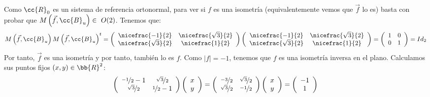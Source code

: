 \begin{ejercicio}
\begin{enumerate}
        Como $\cc{R}_0$ es un sistema de referencia ortonormal, para ver si $f$ es una isometría (equivalentemente vemos que $\vec{f}$ lo es) basta con probar que $M\left(\vec{f}, \cc{B}_u\right)\in~O(2)$. Tenemos que:
        \begin{equation*}
            M\left(\vec{f},\cc{B}_u\right)M\left(\vec{f},\cc{B}_u\right)^t
            = 
            \left(
            \begin{array}{cc}
                \nicefrac{-1}{2} & \nicefrac{\sqrt{3}}{2} \\
                \nicefrac{\sqrt{3}}{2} & \nicefrac{1}{2}
            \end{array}
            \right)
            \left(
            \begin{array}{cc}
                \nicefrac{-1}{2} & \nicefrac{\sqrt{3}}{2} \\
                \nicefrac{\sqrt{3}}{2} & \nicefrac{1}{2}
            \end{array}
            \right)
            = 
            \left(
            \begin{array}{cc}
                1 & 0 \\
                0 & 1 \\
            \end{array}
            \right) = Id_2
        \end{equation*}
        Por tanto, $\vec{f}$ es una isometría y por tanto, también lo es $f$. Como $|f|=-1$, tenemos que $f$ es una isometría inversa en el plano. Calculamos sus puntos fijos $(x,y)\in \bb{R}^2$:
        \begin{equation*}
            \left(
            \begin{array}{cc}
                \nicefrac{-1}{2}-1 & \nicefrac{\sqrt{3}}{2} \\
                \nicefrac{\sqrt{3}}{2} & \nicefrac{1}{2}-1
            \end{array}
            \right)
            \left(
            \begin{array}{c}
                x\\y
            \end{array}
            \right)
            =\left(
            \begin{array}{cc}
                \nicefrac{-3}{2} & \nicefrac{\sqrt{3}}{2} \\
                \nicefrac{\sqrt{3}}{2} & \nicefrac{-1}{2}
            \end{array}
            \right)
            \left(
            \begin{array}{c}
                x\\y
            \end{array}
            \right)
            = \left(
            \begin{array}{c}
                -1\\1
            \end{array}
            \right)
        \end{equation*}


\end{enumerate}
\end{ejercicio}
